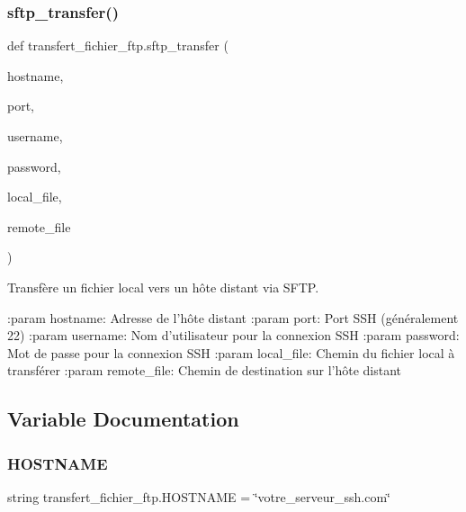 \subsubsection{\texorpdfstring{sftp\+\_\+transfer()}{sftp\_transfer()}}
{\footnotesize\ttfamily def transfert\+\_\+fichier\+\_\+ftp.\+sftp\+\_\+transfer (\begin{DoxyParamCaption}\item[{}]{hostname,  }\item[{}]{port,  }\item[{}]{username,  }\item[{}]{password,  }\item[{}]{local\+\_\+file,  }\item[{}]{remote\+\_\+file }\end{DoxyParamCaption})}

\begin{DoxyVerb}Transfère un fichier local vers un hôte distant via SFTP.

:param hostname: Adresse de l'hôte distant
:param port: Port SSH (généralement 22)
:param username: Nom d'utilisateur pour la connexion SSH
:param password: Mot de passe pour la connexion SSH
:param local_file: Chemin du fichier local à transférer
:param remote_file: Chemin de destination sur l'hôte distant
\end{DoxyVerb}
 

\subsection{Variable Documentation}
\mbox{\label{namespacetransfert__fichier__ftp_aaf924bb1bce6dd4671118f7290805e75}} 
\subsubsection{\texorpdfstring{H\+O\+S\+T\+N\+A\+ME}{HOSTNAME}}
{\footnotesize\ttfamily string transfert\+\_\+fichier\+\_\+ftp.\+H\+O\+S\+T\+N\+A\+ME = \char`\"{}votre\+\_\+serveur\+\_\+ssh.\+com\char`\"{}}

\mbox{\label{namespacetransfert__fichier__ftp_a706a5fc1828223a238c55e82ca7d184a}} 

